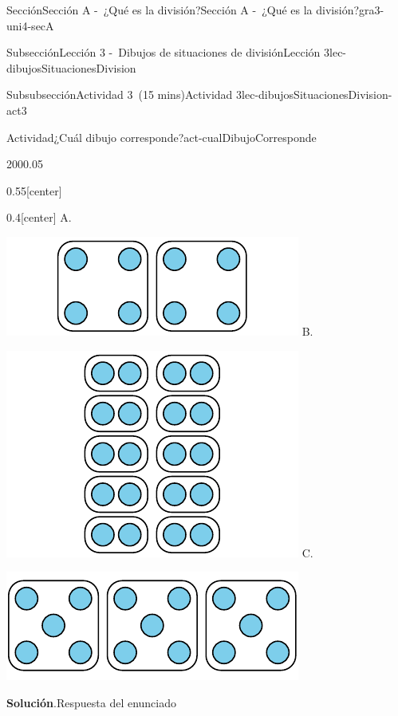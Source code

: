 \documentclass[oneside,10pt,]{article}
\newcommand{\blocktitlefont}{\relax}
\begin{document}
\begin{sectionptx}{Sección}{Sección A -~¿Qué es la división?}{}{Sección A -~¿Qué es la división?}{}{}{gra3-uni4-secA}
\begin{subsectionptx}{Subsección}{Lección 3 -~Dibujos de situaciones de división}{}{Lección 3}{}{}{lec-dibujosSituacionesDivision}
\begin{subsubsectionptx}{Subsubsección}{Actividad 3~(15 mins)}{}{Actividad 3}{}{}{lec-dibujosSituacionesDivision-act3}
\begin{activity}{Actividad}{¿Cuál dibujo corresponde?}{act-cualDibujoCorresponde}
\begin{sidebyside}{2}{0}{0}{0.05}
\begin{sbspanel}{0.55}[center]
\begin{enumerate}
\end{enumerate}
\end{sbspanel}%
\begin{sbspanel}{0.4}[center]%
A.%
\par
\includegraphics[width=\linewidth]{external/svg-source/tikz-file-149313.pdf}
B.%
\par
\includegraphics[width=\linewidth]{external/svg-source/tikz-file-149314.pdf}
C.%
\par
\includegraphics[width=\linewidth]{external/svg-source/tikz-file-149315.pdf}
\end{sbspanel}%
\end{sidebyside}%
\par\smallskip%
\noindent\textbf{\blocktitlefont Solución}.\hypertarget{act-cualDibujoCorresponde-3}{}\quad{}Respuesta del enunciado%

\end{activity}
\end{subsubsectionptx}
\end{subsectionptx}
\end{sectionptx}
\end{document}
